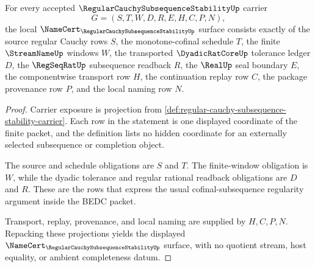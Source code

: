 \begin{theorem}
\label{thm:regular-cauchy-subsequence-stability-namecert-obligations}
For every accepted $\RegularCauchySubsequenceStabilityUp$ carrier
$$
G=(S,T,W,D,R,E,H,C,P,N),
$$
the local $\NameCert_{\RegularCauchySubsequenceStabilityUp}$ surface consists exactly of the source regular Cauchy rows $S$, the monotone-cofinal schedule $T$, the finite $\StreamNameUp$ windows $W$, the transported $\DyadicRatCoreUp$ tolerance ledger $D$, the $\RegSeqRatUp$ subsequence readback $R$, the $\RealUp$ seal boundary $E$, the componentwise transport row $H$, the continuation replay row $C$, the package provenance row $P$, and the local naming row $N$.
\end{theorem}
\begin{proof}
Carrier exposure is projection from \autoref{def:regular-cauchy-subsequence-stability-carrier}. Each row in the statement is one displayed coordinate of the finite packet, and the definition lists no hidden coordinate for an externally selected subsequence or completion object.

The source and schedule obligations are $S$ and $T$. The finite-window obligation is $W$, while the dyadic tolerance and regular rational readback obligations are $D$ and $R$. These are the rows that express the usual cofinal-subsequence regularity argument inside the BEDC packet.

Transport, replay, provenance, and local naming are supplied by $H,C,P,N$. Repacking these projections yields the displayed $\NameCert_{\RegularCauchySubsequenceStabilityUp}$ surface, with no quotient stream, host equality, or ambient completeness datum.
\end{proof}

